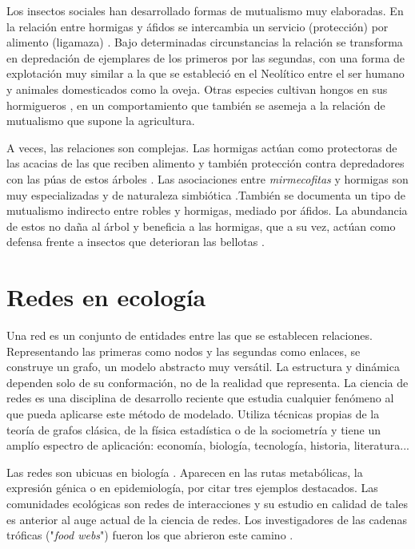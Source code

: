 Los insectos sociales han desarrollado formas de mutualismo muy elaboradas. En la relación entre hormigas y áfidos se intercambia un servicio (protección) por alimento (ligamaza) \cite{volkl1999ant}. Bajo determinadas circunstancias la relación se transforma en depredación de ejemplares de los primeros por las segundas, con una forma de explotación muy similar a la que se estableció en el Neolítico entre el ser humano y animales domesticados como la oveja. Otras especies cultivan hongos en sus hormigueros \cite{mueller2001origin}, en un comportamiento que también se asemeja a la relación de mutualismo que supone la agricultura.

A veces, las relaciones son complejas. Las hormigas actúan como protectoras de las acacias de las que reciben alimento y también protección contra depredadores con las púas de estos árboles \cite{raine2002spatial}. Las asociaciones entre \textit{mirmecofitas} y hormigas son muy especializadas y de naturaleza simbiótica \cite{djieto2004symbiotic}.También se documenta un tipo de mutualismo indirecto entre robles y hormigas, mediado por áfidos. La abundancia de estos no daña al árbol y beneficia a las hormigas, que a su vez, actúan como defensa frente a insectos que deterioran las bellotas \cite{ito1991indirect}.



\section{Redes en ecología}

Una red es un conjunto de entidades entre las que se establecen relaciones. Representando las primeras como nodos y las segundas como enlaces, 
se construye un grafo, un modelo abstracto muy versátil. La estructura y dinámica dependen solo de su conformación, no de la realidad que representa. La ciencia de redes es una disciplina de desarrollo reciente que estudia cualquier fenómeno al que pueda aplicarse este método de modelado. Utiliza técnicas propias de la teoría de grafos clásica, de la física estadística o de la sociometría y tiene un amplío espectro de aplicación: economía, biología, tecnología, historia, literatura... \cite{barabasi2002linked, newman2003structure, brandes2013network}

Las redes son ubicuas en biología \cite{mason2007graph, raymond2009network}. Aparecen en las rutas metabólicas, la expresión génica o en epidemiología, por citar tres ejemplos destacados. Las comunidades ecológicas son redes de interacciones y su estudio en calidad de tales es anterior al auge actual de la ciencia de redes. Los investigadores de las cadenas tróficas ("\textit{food webs}") fueron los que abrieron este camino \cite{pimm1982food,martinez1992constant}.

